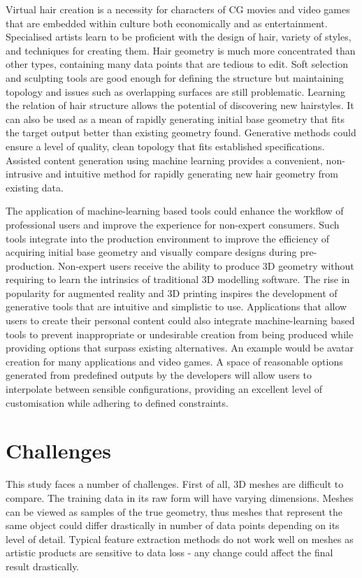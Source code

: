 \documentclass[ %
                    author={Dillon Keith Diep},
                supervisor={Dr. Carl Henrik Ek},
                    degree={MEng},
                     title={Assisted Content Generation for 3D Hair Geometry},
                  subtitle={[INCOMPLETE DRAFT, CONTAINS NOTES FROM RESEARCH]},
                      type={Research},
                      year={2014} ]{dissertation}
\begin{document}
Virtual hair creation is a necessity for characters of CG movies and video games that are embedded within culture both economically and as entertainment. Specialised artists learn to be proficient with the design of hair, variety of styles, and techniques for creating them. Hair geometry is much more concentrated than other types, containing many data points that are tedious to edit. Soft selection and sculpting tools are good enough for defining the structure but maintaining topology and issues such as overlapping surfaces are still problematic. Learning the relation of hair structure allows the potential of discovering new hairstyles.  It can also be used as a mean of rapidly generating initial base geometry that fits the target output better than existing geometry found. Generative methods could ensure a level of quality, clean topology that fits established specifications. Assisted content generation using machine learning provides a convenient, non-intrusive and intuitive method for rapidly generating new hair geometry from existing data.

The application of machine-learning based tools could enhance the workflow of professional users and improve the experience for non-expert consumers. Such tools integrate into the production environment to improve the efficiency of acquiring initial base geometry and visually compare designs during pre-production. Non-expert users receive the ability to produce 3D geometry without requiring to learn the intrinsics of traditional 3D modelling software. The rise in popularity for augmented reality and 3D printing inspires the development of generative tools that are intuitive and simplistic to use. Applications that allow users to create their personal content could also integrate machine-learning based tools to prevent inappropriate or undesirable creation from being produced while providing options that surpass existing alternatives. An example would be avatar creation for many applications and video games. A space of reasonable options generated from predefined outputs by the developers will allow users to interpolate between sensible configurations, providing an excellent level of customisation while adhering to defined constraints.

\section{Challenges}
\noindent
This study faces a number of challenges. First of all, 3D meshes are difficult to compare. The training data in its raw form will have varying dimensions. Meshes can be viewed as samples of the true geometry, thus meshes that represent the same object could differ drastically in number of data points depending on its level of detail. Typical feature extraction methods do not work well on meshes as artistic products are sensitive to data loss - any change could affect the final result drastically.
\end{document}
